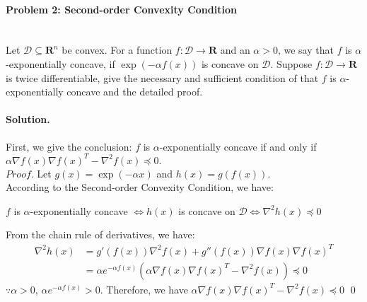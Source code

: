 \documentclass[a4paper]{article}
\newenvironment{solution}
{\color{blue} \paragraph{Solution.\\}}
{\newline \qed}
\begin{document}
\paragraph{Problem 2: Second-order Convexity Condition}
~\\
Let $\mathcal{D}\subseteq\mathbf{R}^n$ be convex. For a function $f:\mathcal{D}\to\mathbf{R}$ and an $\alpha>0$, we say that $f$ is $\alpha$-exponentially concave, if $\exp(-\alpha f(x))$ is concave on $\mathcal{D}$. Suppose $f:\mathcal{D}\to\mathbf{R}$ is twice differentiable, give the necessary and sufficient condition of that $f$ is $\alpha$-exponentially concave and the detailed proof.
\begin{solution}
	First, we give the conclusion: 			
	$f$ is $\alpha$-exponentially concave if and only if $\alpha \nabla f(x)\nabla f(x)^T-\nabla^2f(x)\preccurlyeq 0.$\\
$Proof.$ Let $g(x)=\exp(-\alpha x)$ and $h(x)=g(f(x))$. \\According to the Second-order Convexity Condition, we have:
	\begin{center}
	$f$ is $\alpha$-exponentially concave $\iff h(x)$ is concave on $\mathcal{D} \iff \nabla^2h(x)\preccurlyeq 0$
	\end{center}
	From the chain rule of derivatives, we have:
	\begin{equation}\nonumber
	\begin{aligned}
	\nabla^2h(x) &= g'(f(x))\nabla^2f(x)+g''(f(x))\nabla f(x)\nabla f(x)^T\\&= \alpha e^{-\alpha f(x)}\left(\alpha \nabla f(x)\nabla f(x)^T-\nabla^2f(x)\right)\preccurlyeq 0 
	\end{aligned}
	\end{equation}			
	$\because \alpha>0$, $\alpha e^{-\alpha f(x)}>0$. Therefore, we have $\alpha \nabla f(x)\nabla f(x)^T-\nabla^2f(x)\preccurlyeq 0$
\end{solution}
\end{document}
